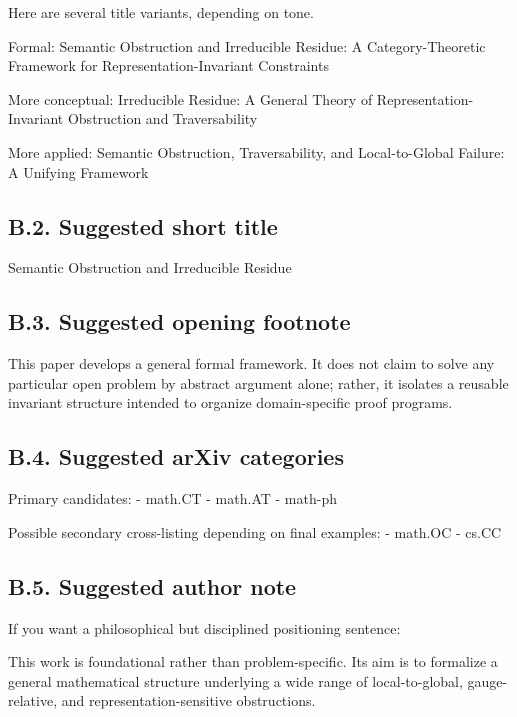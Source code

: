 \documentclass[
]{article}
\begin{document}
Here are several title variants, depending on tone.

Formal: Semantic Obstruction and Irreducible Residue: A
Category-Theoretic Framework for Representation-Invariant Constraints

More conceptual: Irreducible Residue: A General Theory of
Representation-Invariant Obstruction and Traversability

More applied: Semantic Obstruction, Traversability, and Local-to-Global
Failure: A Unifying Framework

\subsection{B.2. Suggested short
title}\label{b.2.-suggested-short-title}

Semantic Obstruction and Irreducible Residue

\subsection{B.3. Suggested opening
footnote}\label{b.3.-suggested-opening-footnote}

This paper develops a general formal framework. It does not claim to
solve any particular open problem by abstract argument alone; rather, it
isolates a reusable invariant structure intended to organize
domain-specific proof programs.

\subsection{B.4. Suggested arXiv
categories}\label{b.4.-suggested-arxiv-categories}

Primary candidates: - math.CT - math.AT - math-ph

Possible secondary cross-listing depending on final examples: - math.OC
- cs.CC

\subsection{B.5. Suggested author
note}\label{b.5.-suggested-author-note}

If you want a philosophical but disciplined positioning sentence:

This work is foundational rather than problem-specific. Its aim is to
formalize a general mathematical structure underlying a wide range of
local-to-global, gauge-relative, and representation-sensitive
obstructions.
\end{document}
